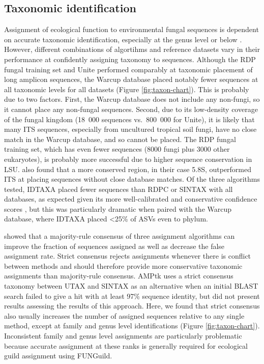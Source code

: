 \documentclass[
  12pt,
]{article}
\begin{document}
\hypertarget{taxonomic-identification}{%
\subsection{Taxonomic identification}\label{taxonomic-identification}}

Assignment of ecological function to environmental fungal sequences is dependent on accurate taxonomic identification, especially at the genus level or below \autocite{nguyen2016funguild}.
However, different combinations of algortihms and reference datasets vary in their performance at confidently assigning taxonomy to sequences.
Although the RDP fungal training set and Unite performed comparably at taxonomic placement of long amplicon sequences, the Warcup database placed notably fewer sequences at all taxonomic levels for all datasets (Figure \ref{fig:taxon-chart}).
This is probably due to two factors.
First, the Warcup database does not include any non-fungi, so it cannot place any non-fungal sequences.
Second, due to its low-density coverage of the fungal kingdom (18~000 sequences vs.~800~000 for Unite), it is likely that many ITS sequences, especially from uncultured tropical soil fungi, have no close match in the Warcup database, and so cannot be placed.
The RDP fungal training set, which has even fewer sequences (8000 fungi plus 3000 other eukaryotes), is probably more successful due to higher sequence conservation in LSU.
\textcite{heeger2019} also found that a more conserved region, in their case 5.8S, outperformed ITS at placing sequences without close database matches.
Of the three algorithms tested, IDTAXA placed fewer sequences than RDPC or SINTAX with all databases, as expected given its more well-calibrated and conservative confidence scores \autocite{murali2018a}, but this was particularly dramatic when paired with the Warcup database, where IDTAXA placed \textless25\% of ASVs even to phylum.

\textcite{gdanetz2017} showed that a majority-rule consensus of three assignment algorithms can improve the fraction of sequences assigned as well as decrease the false assignment rate.
Strict consensus rejects assignments whenever there is conflict between methods and should therefore provide more conservative taxonomic assignments than majority-rule consensus.
AMPtk \autocite{palmer2018} uses a strict consensus taxonomy between UTAX and SINTAX as an alternative when an initial BLAST search failed to give a hit with at least 97\% sequence identity, but did not present results assessing the results of this approach.
Here, we found that strict consensus also usually increases the number of assigned sequences relative to any single method, except at family and genus level identifications (Figure \ref{fig:taxon-chart}).
Inconsistent family and genus level assignments are particularly problematic because accurate assignment at these ranks is generally required for ecological guild assignment using FUNGuild.
\end{document}
